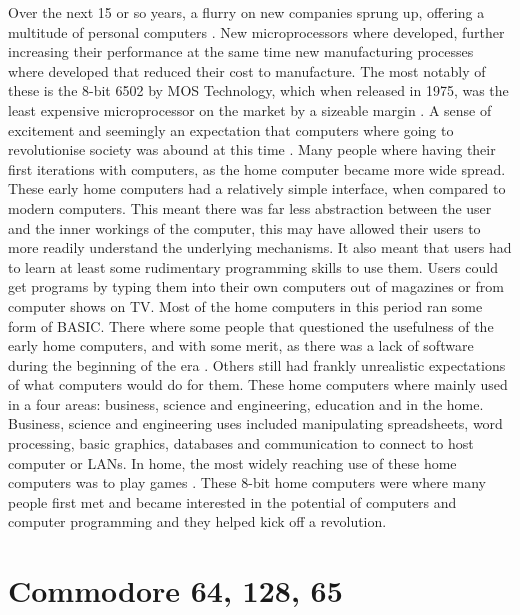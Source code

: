 Over the next 15 or so years, a flurry on new companies sprung up, offering a multitude of personal computers \cite{Micro}. New microprocessors where developed, further increasing their performance at the same time new manufacturing processes where developed that reduced their cost to manufacture. The most notably of these is the 8-bit 6502 by MOS Technology, which when released in 1975, was the least expensive microprocessor on the market by a sizeable margin 
\cite{EET75}. A sense of excitement and seemingly an expectation that computers where going to revolutionise society was abound at this time 
\cite{Cass14}. Many people where having their first iterations with computers, as the home computer became more wide spread. These early home computers had a relatively simple interface, when compared to modern computers. This meant there was far less abstraction between the user and the inner workings of the computer, this may have allowed their users to more readily understand the underlying mechanisms. It also meant that users had to learn at least some rudimentary programming skills to use them. Users could get programs by typing them into their own computers out of magazines or from computer shows on TV. Most of the home computers in this period ran some form of BASIC. There where some people that questioned the usefulness of the early home computers, and with some merit, as there was a lack of software during the beginning of the era
\cite{Swalwell12}. Others still had frankly unrealistic expectations of what computers would do for them. These home computers where mainly used in a four areas: business, science and engineering, education and in the home. Business, science and engineering uses included manipulating spreadsheets, word processing, basic graphics, databases and communication to connect to host computer or LANs. In home, the most widely reaching use of these home computers was to play games 
\cite{Gupta84}. These 8-bit home computers were where many people first met and became interested in the potential of computers and computer programming and they helped kick off a revolution.


\section{Commodore 64, 128, 65}
